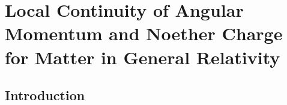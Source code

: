 




\label{q:sec:q}




\section{Local Continuity of Angular Momentum and Noether Charge for Matter in General Relativity}





\subsection{Introduction} \label{q:sect:intro}

